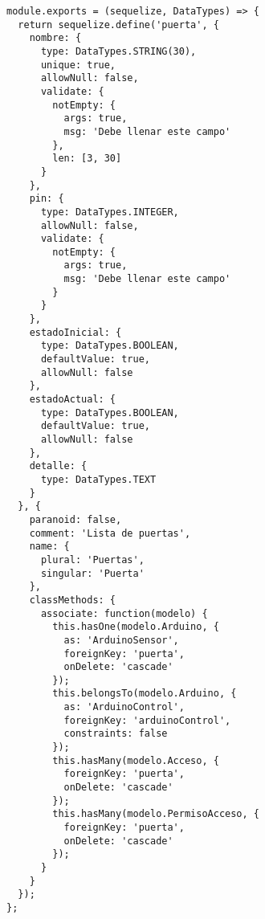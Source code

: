 \begin{lstlisting}[label=anx:modelo_puerta]
module.exports = (sequelize, DataTypes) => {
  return sequelize.define('puerta', {
    nombre: {
      type: DataTypes.STRING(30),
      unique: true,
      allowNull: false,
      validate: {
        notEmpty: {
          args: true,
          msg: 'Debe llenar este campo'
        },
        len: [3, 30]
      }
    },
    pin: {
      type: DataTypes.INTEGER,
      allowNull: false,
      validate: {
        notEmpty: {
          args: true,
          msg: 'Debe llenar este campo'
        }
      }
    },
    estadoInicial: {
      type: DataTypes.BOOLEAN,
      defaultValue: true,
      allowNull: false
    },
    estadoActual: {
      type: DataTypes.BOOLEAN,
      defaultValue: true,
      allowNull: false
    },
    detalle: {
      type: DataTypes.TEXT
    }
  }, {
    paranoid: false,
    comment: 'Lista de puertas',
    name: {
      plural: 'Puertas',
      singular: 'Puerta'
    },
    classMethods: {
      associate: function(modelo) {
        this.hasOne(modelo.Arduino, {
          as: 'ArduinoSensor',
          foreignKey: 'puerta',
          onDelete: 'cascade'
        });
        this.belongsTo(modelo.Arduino, {
          as: 'ArduinoControl',
          foreignKey: 'arduinoControl',
          constraints: false
        });
        this.hasMany(modelo.Acceso, {
          foreignKey: 'puerta',
          onDelete: 'cascade'
        });
        this.hasMany(modelo.PermisoAcceso, {
          foreignKey: 'puerta',
          onDelete: 'cascade'
        });
      }
    }
  });
};
\end{lstlisting}